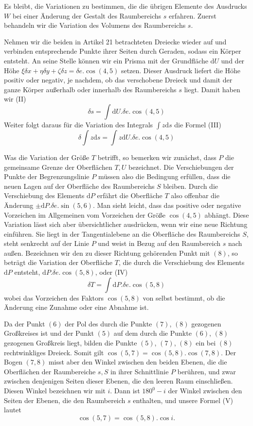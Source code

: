 Es bleibt, die Variationen zu bestimmen, die die übrigen Elemente des Ausdrucks $W$ bei einer Änderung der Gestalt des Raumbereichs $s$ erfahren. Zuerst behandeln wir die Variation des Volumens des Raumbereichs $s$.

Nehmen wir die beiden in Artikel 21 betrachteten Dreiecke wieder auf und verbinden entsprechende Punkte ihrer Seiten durch Geraden, sodass ein Körper entsteht. An seine Stelle können wir ein Prisma mit der Grundfläche $\mathrm{d}U$ und der Höhe $\xi\delta x+\eta\delta y+\zeta\delta z=\delta e.\cos(4,5)$ setzen. Dieser Ausdruck liefert die Höhe positiv oder negativ, je nachdem, ob das verschobene Dreieck und damit der ganze Körper außerhalb oder innerhalb des Raumbereichs $s$ liegt. Damit haben wir (II)
\[
\delta s=\int\mathrm{d}U.\delta e.\cos(4,5)
\]
Weiter folgt daraus für die Variation des Integrals $\int z\mathrm{d}s$ die Formel (III)
\[
\delta\int z\mathrm{d}s=\int z\mathrm{d}U.\delta e.\cos(4,5)
\]

Was die Variation der Größe $T$ betrifft, so bemerken wir zunächst, dass $P$ die gemeinsame Grenze der Oberflächen $T,U$ bezeichnet. Die Verschiebungen der
Punkte der Begrenzungslinie $P$ müssen also die Bedingung erfüllen, dass die neuen Lagen auf der Oberfläche des Raumbereichs $S$ bleiben. Durch die Verschiebung des Elements $\mathrm{d}P$ erfährt die Oberfläche $T$ also offenbar die Änderung $\pm\mathrm{d}P.\delta e.\sin(5,6)$. Man sieht leicht, dass das positive oder negative Vorzeichen im Allgemeinen vom Vorzeichen der Größe $\cos(4,5)$ abhängt. Diese Variation lässt sich aber übersichtlicher ausdrücken, wenn wir eine neue Richtung einführen. Sie liegt in der Tangentialebene an die Oberfläche des Raumbereichs $S$, steht senkrecht auf der Linie $P$ und weist in Bezug auf den Raumbereich $s$ nach außen. Bezeichnen wir den zu dieser Richtung gehörenden Punkt mit $(8)$, so beträgt die Variation der Oberfläche $T$, die durch die Verschiebung des Elements $\mathrm{d}P$ entsteht, $\mathrm{d}P.\delta e.\cos(5,8)$, oder (IV)
\[
\delta T=\int\mathrm{d}P.\delta e.\cos(5,8)
\]
wobei das Vorzeichen des Faktors $\cos(5,8)$ von selbst bestimmt, ob die Änderung eine Zunahme oder eine Abnahme ist.

Da der Punkt $(6)$ der Pol des durch die Punkte $(7)$, $(8)$ gezogenen Großkreises ist und der Punkt $(5)$ auf dem durch die Punkte $(6)$, $(8)$ gezogenen Großkreis liegt, bilden die Punkte $(5)$, $(7)$, $(8)$ ein bei $(8)$ rechtwinkliges Dreieck. Somit gilt $\cos(5,7)=\cos(5,8).\cos(7,8)$. Der Bogen $(7,8)$ misst aber den Winkel zwischen den beiden Ebenen, die die Oberflächen der Raumbereiche $s,S$ in ihrer Schnittlinie $P$ berühren, und zwar zwischen denjenigen Seiten dieser Ebenen, die den leeren Raum einschließen. Diesen Winkel bezeichnen wir mit $i$. Dann ist $180^0-i$ der Winkel zwischen den Seiten der Ebenen, die den Raumbereich $s$ enthalten, und unsere Formel (V) lautet
\[
\cos(5,7)=\cos(5,8).\cos i.
\]

